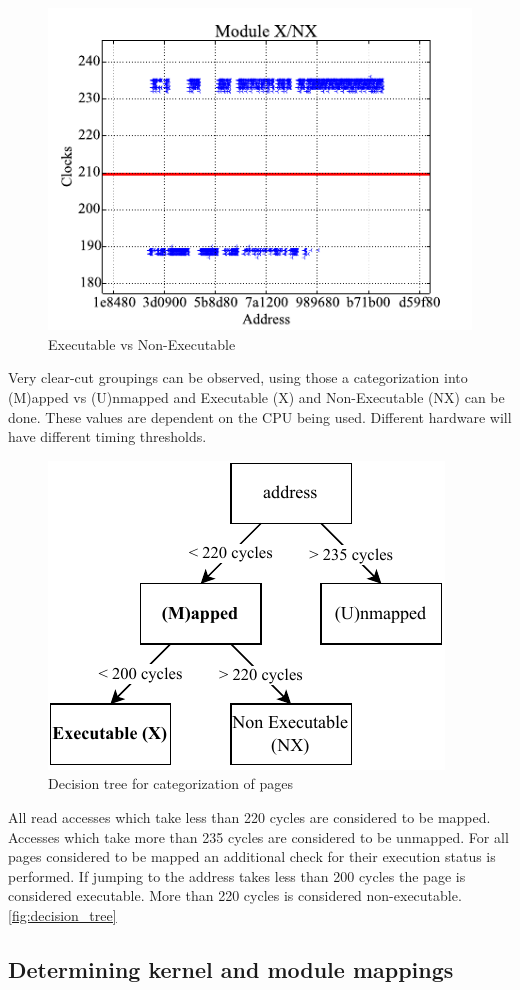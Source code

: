 \begin{figure}[h]
  \begin{center}
    \includegraphics[page=1,width=.4\textwidth]{fig/prebuilt_results_X_NX}
  \end{center}
  \caption{Executable vs Non-Executable \cite[Figure~6]{drk}}
  \label{fig:timing_x_nx}
\end{figure}

Very clear-cut groupings can be observed, using those a categorization into (M)apped vs (U)nmapped and Executable (X) and Non-Executable (NX) can be done.
These values are dependent on the CPU being used. Different hardware will have different timing thresholds.

\begin{figure}[h]
  \begin{center}
    \includegraphics[page=1,width=.4\textwidth]{fig/prebuilt_decision_tree}
  \end{center}
  \caption{Decision tree for categorization of pages\cite[Figure~4]{drk}}
  \label{fig:decision_tree}
\end{figure}

All read accesses which take less than 220 cycles are considered to be mapped.
Accesses which take more than 235 cycles are considered to be unmapped.
For all pages considered to be mapped an additional check for their execution status is performed.
If jumping to the address takes less than 200 cycles the page is considered executable.
More than 220 cycles is considered non-executable.\autoref{fig:decision_tree} \cite{drk}

\subsection{Determining kernel and module mappings}


